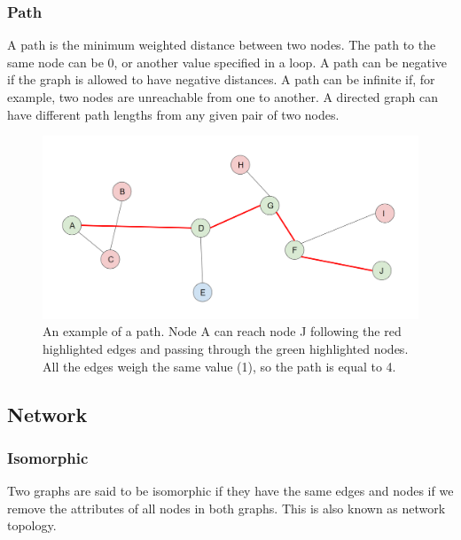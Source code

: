 \subsubsection{Path}

A path is the minimum weighted distance between two nodes. The path to the same node can be 0, or another value specified in a loop. A path can be negative if the graph is allowed to have negative distances. A path can be infinite if, for example, two nodes are unreachable from one to another. A directed graph can have different path lengths from any given pair of two nodes.

    \begin{figure}[h]
        \centering
            \includegraphics[width=0.7\linewidth]{figures/Networks/Concepts/path.png} 
        \caption{An example of a path. Node A can reach node J following the red highlighted edges and passing through the green highlighted nodes. All the edges weigh the same value (1), so the path is equal to 4.}
        \label{figure:networkPath}
    \end{figure}

\subsection{Network}




\subsubsection{Isomorphic}
\label{network:isomorphic}

Two graphs are said to be isomorphic if they have the same edges and nodes if we remove the attributes of all nodes in both graphs. This is also known as network topology.

